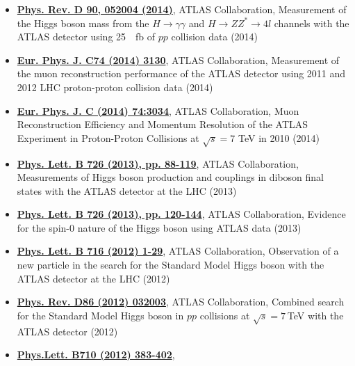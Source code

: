 \begin{cvinterests}
{\begin{itemize}[labelwidth=0.05in,align=right,leftmargin=!,labelsep=0pt,
itemsep=0.0em]
ATLAS Collaboration, Fiducial and differential cross sections of Higgs boson
production measured in the four-lepton decay channel in $pp$ collisions at a
centre-of-mass energy of \SI{8}{\tera\electronvolt} with the ATLAS detector
(2014)
%
\item[] \href{http://journals.aps.org/prd/abstract/10.1103/PhysRevD.90.052004}{\textbf{Phys. Rev. D 90, 052004 (2014)}},
ATLAS Collaboration, Measurement of the Higgs boson mass from the
$H\to\gamma\gamma$ and $H\to ZZ^{*}\to 4l$ channels with the ATLAS detector
using \SI{25}{\per\femto\barn} of $pp$ collision data (2014)
%
\item[] \href{http://link.springer.com/article/10.1140\%2Fepjc\%2Fs10052-014-3130-x}{\textbf{Eur. Phys. J. C74 (2014) 3130}},
ATLAS Collaboration, Measurement of the muon reconstruction performance of
the ATLAS detector using 2011 and 2012 LHC proton-proton collision data (2014)
%
\item[] \href{link.springer.com/article/10.1140/epjc/s10052-014-3034-9}{\textbf{Eur. Phys. J. C (2014) 74:3034}}, 
ATLAS Collaboration, Muon Reconstruction Efficiency and Momentum Resolution of
the ATLAS Experiment in Proton-Proton Collisions at $\sqrt{s}=7$
\si{\tera\electronvolt} in 2010 (2014)
%
\item[] \href{http://www.sciencedirect.com/science/article/pii/S0370269313006369}{\textbf{Phys. Lett. B 726 (2013), pp. 88-119}},
ATLAS Collaboration, Measurements of Higgs boson production and couplings in
diboson final states with the ATLAS detector at the LHC (2013)
%
\item[]  \href{http://www.sciencedirect.com/science/article/pii/S0370269313006527}{\textbf{Phys. Lett. B 726 (2013), pp. 120-144}},
ATLAS Collaboration, Evidence for the spin-0 nature of the Higgs boson using
ATLAS data (2013)
%
\item[] \href{http://www.sciencedirect.com/science/article/pii/S037026931200857X}{\textbf{Phys. Lett. B 716 (2012) 1-29}},
ATLAS Collaboration, Observation of a new particle in the search for the
Standard Model Higgs boson with the ATLAS detector at the LHC (2012)
%
\item[] \href{http://journals.aps.org/prd/abstract/10.1103/PhysRevD.86.032003}{\textbf{Phys. Rev. D86 (2012) 032003}},
ATLAS Collaboration, Combined search for the Standard Model Higgs boson in $pp$
collisions at $\sqrt{s}=7$ \si{\tera\electronvolt} with the ATLAS detector
(2012)
%
\item[] \href{http://www.sciencedirect.com/science/article/pii/S0370269312002560}{\textbf{Phys.Lett. B710 (2012) 383-402}},

\end{itemize}}
\end{cvinterests}
